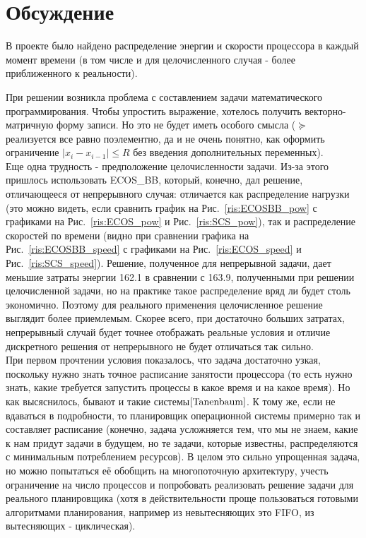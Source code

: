 \documentclass{article}
\begin{document}
\section{Обсуждение}

В проекте было найдено распределение энергии и скорости процессора в каждый момент времени (в том числе и для целочисленного случая - более приближенного к реальности).

При решении возникла проблема с составлением задачи математического программирования. Чтобы упростить выражение, хотелось получить векторно-матричную форму записи. Но это не будет иметь особого смысла ($\succeq$ реализуется все равно поэлементно, да и не очень понятно, как оформить ограничение $|x_i-x_{i-1}| \le R$ без введения дополнительных переменных). \\

Еще одна трудность - предположение целочисленности задачи. Из-за этого пришлось использовать ECOS\_BB, который, конечно, дал решение, отличающееся от непрерывного случая: отличается как распределение нагрузки (это можно видеть, если сравнить график на Рис.~\ref{ris:ECOSBB_pow} с графиками на Рис.~\ref{ris:ECOS_pow} и Рис.~\ref{ris:SCS_pow}), так и распределение скоростей по времени (видно при сравнении графика на Рис.~\ref{ris:ECOSBB_speed} с графиками на Рис.~\ref{ris:ECOS_speed} и Рис.~\ref{ris:SCS_speed}). Решение, полученное для непрерывной задачи, дает меньшие затраты энергии 162.1 в сравнении с 163.9, полученными при решении целочисленной задачи, но на практике такое распределение вряд ли будет столь экономично. Поэтому для реального применения целочисленное решение выглядит более приемлемым. Скорее всего, при достаточно больших затратах, непрерывный случай будет точнее отображать реальные условия и отличие дискретного решения от непрерывного не будет отличаться так сильно. \\

При первом прочтении условия показалось, что задача достаточно узкая, поскольку нужно знать точное расписание занятости процессора (то есть нужно знать, какие требуется запустить процессы в какое время и на какое время). Но как высяснилось, бывают и такие системы$\cite{Tanenbaum}$. К тому же, если не вдаваться в подробности, то планировщик операционной системы примерно так и составляет расписание (конечно, задача усложняется тем, что мы не знаем, какие к нам придут задачи в будущем, но те задачи, которые известны, распределяются с минимальным потреблением ресурсов). В целом это сильно упрощенная задача, но можно попытаться её обобщить на многопоточную архитектуру, учесть ограничение на число процессов и попробовать реализовать решение задачи для реального планировщика (хотя в действительности проще пользоваться готовыми алгоритмами планирования, например из невытесняющих это FIFO, из вытесняющих - циклическая).\\
\end{document}
